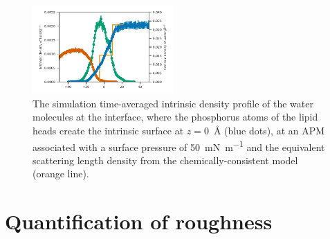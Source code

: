 \documentclass[amsmath,amssymb,superscriptaddress]{revtex4-1}
\begin{document}
\begin{figure}
\centering
  \includegraphics[width=0.48\textwidth]{water_50}
  \caption{The simulation time-averaged intrinsic density profile of the water molecules at the interface, where the phosphorus atoms of the lipid heads create the intrinsic surface at $z=$\SI{0}{\angstrom} (blue dots), at an APM associated with a surface pressure of \SI{50}{\milli\newton\per\meter} and the equivalent scattering length density from the chemically-consistent model (orange line).}
  \label{fig:waters50}
\end{figure}
%

\section{Quantification of roughness}
\end{document}
